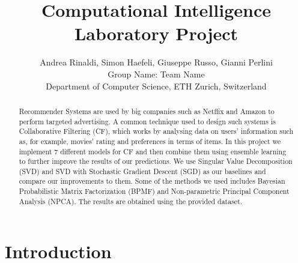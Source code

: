 \documentclass[10pt,conference,compsocconf]{IEEEtran}
\begin{document}
\title{Computational Intelligence Laboratory Project}

\author{
  Andrea Rinaldi, Simon Haefeli, Giuseppe Russo, Gianni Perlini\\
  Group Name: Team Name \\
  Department of Computer Science, ETH Zurich, Switzerland
}

\maketitle

\begin{abstract}

Recommender Systems are used by big companies such as Netflix and Amazon to perform targeted advertising. A common technique used to design such systems is Collaborative Filtering (CF), which works by analysing data on users' information such as, for example, movies' rating and preferences in terms of items. In this project we implement 7 different models for CF and then combine them using ensemble learning to further improve the results of our predictions. We use Singular Value Decomposition (SVD) and SVD with Stochastic Gradient Descent (SGD) as our baselines and compare our improvements to them. Some of the methods we used includes Bayesian Probabilistic Matrix Factorization (BPMF) and Non-parametric Principal Component Analysis (NPCA). The results are obtained using the provided dataset. %

\end{abstract}

\section{Introduction}
\label{int}
\end{document}
